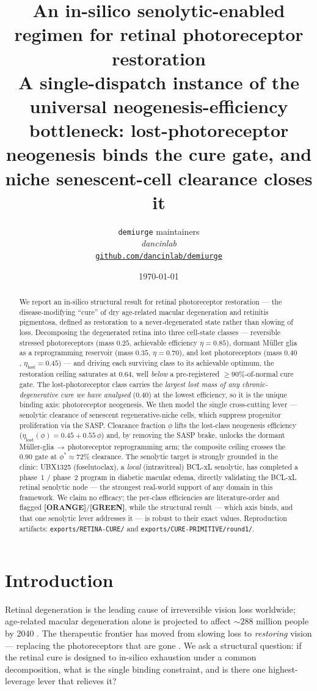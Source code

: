 \documentclass[11pt,a4paper]{article}
\title{
  \textbf{An in-silico senolytic-enabled regimen for retinal
  photoreceptor restoration}\\[4pt]
  \large A single-dispatch instance of the universal neogenesis-efficiency
  bottleneck: lost-photoreceptor neogenesis binds the cure gate, and
  niche senescent-cell clearance closes it
}
\author{
  \texttt{demiurge} maintainers\\
  \normalsize\textit{dancinlab}\\[2pt]
  \normalsize\href{https://github.com/dancinlab/demiurge}{\texttt{github.com/dancinlab/demiurge}}
}
\date{\today}
\newcommand{\tierbadge}[2]{\textcolor{#1}{\textbf{[#2]}}}
\providecommand{\tierGreen}{\tierbadge{green!45!black}{GREEN}}
\providecommand{\tierOrange}{\tierbadge{orange!80!black}{ORANGE}}
\begin{document}
\maketitle

\begin{abstract}
We report an in-silico structural result for retinal photoreceptor restoration
--- the disease-modifying ``cure'' of dry age-related macular degeneration and
retinitis pigmentosa, defined as restoration to a never-degenerated state rather
than slowing of loss. Decomposing the degenerated retina into three cell-state
classes --- reversible stressed photoreceptors (mass $0.25$, achievable efficiency
$\eta=0.85$), dormant M\"uller glia as a reprogramming reservoir (mass $0.35$,
$\eta=0.70$), and lost photoreceptors (mass $0.40$, $\eta_{\text{lost}}=0.45$) ---
and driving each surviving class to its achievable optimum, the restoration ceiling
saturates at $0.64$, well \emph{below} a pre-registered $\geq 90\%$-of-normal cure
gate. The lost-photoreceptor class carries the \emph{largest lost mass of any
chronic-degenerative cure we have analysed} ($0.40$) at the lowest efficiency, so
it is the unique binding axis: photoreceptor neogenesis. We then model the single
cross-cutting lever --- senolytic clearance of senescent regenerative-niche cells,
which suppress progenitor proliferation via the SASP. Clearance fraction $\phi$ lifts
the lost-class neogenesis efficiency ($\eta_{\text{lost}}(\phi)=0.45+0.55\,\phi$) and,
by removing the SASP brake, unlocks the dormant M\"uller-glia\,$\to$\,photoreceptor
reprogramming arm; the composite ceiling crosses the $0.90$ gate at
$\phi^\ast\!\approx\!72\%$ clearance. The senolytic target is strongly grounded in the
clinic: UBX1325 (foselutoclax), a \emph{local} (intravitreal) BCL-xL senolytic, has
completed a phase~1 / phase~2 program in diabetic macular edema, directly validating
the BCL-xL retinal senolytic node --- the strongest real-world support of any domain
in this framework. We claim no efficacy; the per-class efficiencies are literature-order
and flagged \tierOrange/\tierGreen, while the structural result --- which axis binds, and
that one senolytic lever addresses it --- is robust to their exact values. Reproduction
artifacts: \texttt{exports/RETINA-CURE/} and \texttt{exports/CURE-PRIMITIVE/round1/}.
\end{abstract}

\section{Introduction}
\label{sec:intro}
Retinal degeneration is the leading cause of irreversible vision loss worldwide; age-related
macular degeneration alone is projected to affect ${\sim}288$ million people by 2040
\citep{wong2014}. The therapeutic frontier has moved from slowing loss to \emph{restoring}
vision --- replacing the photoreceptors that are gone \citep{maclaren2006,ribeiro2021}. We ask
a structural question: if the retinal cure is designed to in-silico exhaustion under a common
decomposition, what is the single binding constraint, and is there one highest-leverage lever
that relieves it?
\end{document}
